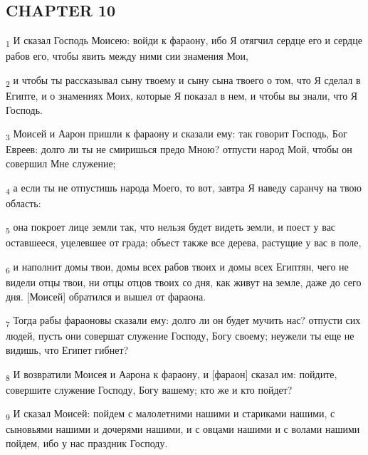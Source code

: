 \subsection{CHAPTER 10}
\begin{tcolorbox}
\textsubscript{1} И сказал Господь Моисею: войди к фараону, ибо Я отягчил сердце его и сердце рабов его, чтобы явить между ними сии знамения Мои,
\end{tcolorbox}
\begin{tcolorbox}
\textsubscript{2} и чтобы ты рассказывал сыну твоему и сыну сына твоего о том, что Я сделал в Египте, и о знамениях Моих, которые Я показал в нем, и чтобы вы знали, что Я Господь.
\end{tcolorbox}
\begin{tcolorbox}
\textsubscript{3} Моисей и Аарон пришли к фараону и сказали ему: так говорит Господь, Бог Евреев: долго ли ты не смиришься предо Мною? отпусти народ Мой, чтобы он совершил Мне служение;
\end{tcolorbox}
\begin{tcolorbox}
\textsubscript{4} а если ты не отпустишь народа Моего, то вот, завтра Я наведу саранчу на твою область:
\end{tcolorbox}
\begin{tcolorbox}
\textsubscript{5} она покроет лице земли так, что нельзя будет видеть земли, и поест у вас оставшееся, уцелевшее от града; объест также все дерева, растущие у вас в поле,
\end{tcolorbox}
\begin{tcolorbox}
\textsubscript{6} и наполнит домы твои, домы всех рабов твоих и домы всех Египтян, чего не видели отцы твои, ни отцы отцов твоих со дня, как живут на земле, даже до сего дня. [Моисей] обратился и вышел от фараона.
\end{tcolorbox}
\begin{tcolorbox}
\textsubscript{7} Тогда рабы фараоновы сказали ему: долго ли он будет мучить нас? отпусти сих людей, пусть они совершат служение Господу, Богу своему; неужели ты еще не видишь, что Египет гибнет?
\end{tcolorbox}
\begin{tcolorbox}
\textsubscript{8} И возвратили Моисея и Аарона к фараону, и [фараон] сказал им: пойдите, совершите служение Господу, Богу вашему; кто же и кто пойдет?
\end{tcolorbox}
\begin{tcolorbox}
\textsubscript{9} И сказал Моисей: пойдем с малолетними нашими и стариками нашими, с сыновьями нашими и дочерями нашими, и с овцами нашими и с волами нашими пойдем, ибо у нас праздник Господу.
\end{tcolorbox}

